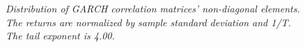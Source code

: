 \documentclass{article}
\begin{document}
\begin{figure}[htb!]
  \centering
  \caption{\small \it Distribution of GARCH correlation matrices'
    non-diagonal elements. The returns are normalized by sample
    standard deviation and 1/T. The tail exponent is 4.00.}
  \label{fig:garch_Cij_4.00}
\end{figure}
\end{document}
